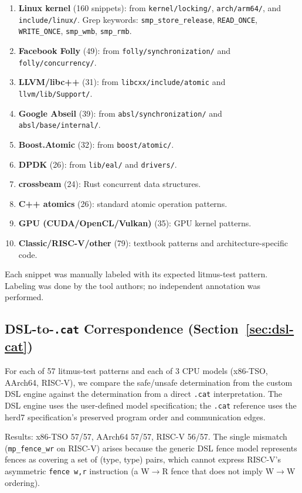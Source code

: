 \documentclass[11pt]{article}
\begin{document}
\begin{enumerate}[nosep]
\item \textbf{Linux kernel} (160 snippets): from
  \texttt{kernel/\allowbreak{}locking/},
  \texttt{arch/\allowbreak{}arm64/}, and
  \texttt{include/\allowbreak{}linux/}.
  Grep keywords: \texttt{smp\_store\_release},
  \texttt{READ\_ONCE}, \texttt{WRITE\_ONCE},
  \texttt{smp\_wmb}, \texttt{smp\_rmb}.
\item \textbf{Facebook Folly} (49): from \texttt{folly/synchronization/}
  and \texttt{folly/concurrency/}.
\item \textbf{LLVM/libc++} (31): from \texttt{libcxx/include/atomic}
  and \texttt{llvm/lib/Support/}.
\item \textbf{Google Abseil} (39): from \texttt{absl/synchronization/}
  and \texttt{absl/base/internal/}.
\item \textbf{Boost.Atomic} (32): from \texttt{boost/atomic/}.
\item \textbf{DPDK} (26): from \texttt{lib/eal/} and \texttt{drivers/}.
\item \textbf{crossbeam} (24): Rust concurrent data structures.
\item \textbf{C++ atomics} (26): standard atomic operation patterns.
\item \textbf{GPU (CUDA/OpenCL/Vulkan)} (35): GPU kernel patterns.
\item \textbf{Classic/RISC-V/other} (79): textbook patterns and
  architecture-specific code.
\end{enumerate}

\noindent
Each snippet was manually labeled with its expected litmus-test pattern.
Labeling was done by the tool authors; no independent annotation was performed.

\subsection{DSL-to-\texttt{.cat} Correspondence (Section~\ref{sec:dsl-cat})}

For each of 57 litmus-test patterns and each of 3 CPU models
(x86-TSO, AArch64, RISC-V), we compare the safe/unsafe determination
from the custom DSL engine against the determination from a direct
\texttt{.cat} interpretation.  The DSL engine uses the user-defined
model specification; the \texttt{.cat} reference uses the herd7
specification's preserved program order and communication edges.

Results: x86-TSO 57/57, AArch64 57/57, RISC-V 56/57.
The single mismatch (\texttt{mp\_fence\_wr} on RISC-V) arises because
the generic DSL fence model represents fences as covering a set of
(type, type) pairs, which cannot express RISC-V's asymmetric
\texttt{fence w,r} instruction (a W$\to$R fence that does not
imply W$\to$W ordering).
\end{document}
